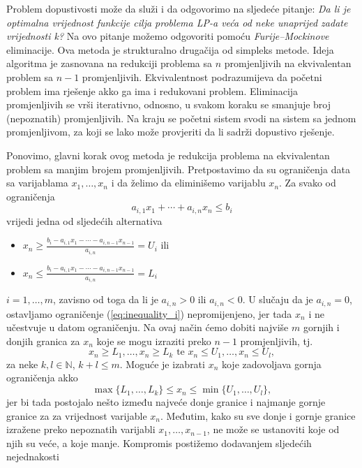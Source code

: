 \documentclass[a4paper, utf8, 11pt, colorlinks]{book}
\theoremstyle{definition}
\begin{document}
Problem dopustivosti može da služi i da odgovorimo na sljedeće pitanje: 
\emph{Da li je optimalna vrijednost funkcije cilja problema LP-a veća od neke unaprijed zadate  vrijednosti k?}
 Na ovo pitanje možemo odgovoriti pomoću  \emph{Furije–Mockinove} eliminacije. Ova metoda je strukturalno drugačija  od simpleks metode. Ideja algoritma je zasnovana na redukciji problema sa $n$ promjenljivih na ekvivalentan problem sa $n-1$ promjenljivih. Ekvivalentnost podrazumijeva da početni problem ima rješenje akko  ga ima i redukovani problem. Eliminacija promjenljivih se vrši iterativno, odnosno, u svakom koraku se smanjuje broj (nepoznatih)  promjenljivih. Na kraju se početni sistem svodi na sistem sa jednom promjenljivom, za koji se lako može provjeriti da li sadrži dopustivo rješenje.
 
 Ponovimo, glavni korak ovog metoda je redukcija problema na ekvivalentan problem sa manjim brojem promjenljivih. Pretpostavimo da su ograničenja data sa varijablama $x_1,\ldots, x_n$ i da želimo da eliminišemo varijablu $x_n$. Za svako od ograničenja
 \begin{equation}\label{eq:inequality_i}
      a_{i,1} x_1 + \cdots + a_{i,n} x_n \leq b_i
 \end{equation}
 vrijedi jedna od sljedećih alternativa 
 \begin{itemize}
 	 \item  $x_n \geq \frac{b_i - a_{i,1}x_1- \cdots - a_{i, n-1} x_{n-1} }{a_{i,n}}=U_i$ ili 
 	 \item   $x_n \leq \frac{b_i - a_{i,1}x_1- \cdots - a_{i, n-1} x_{n-1} }{a_{i,n}}=L_i$
 \end{itemize}
 $i=1,\ldots, m$, zavisno od toga da li je $a_{i,n} >0$ ili $a_{i,n} <0$. U slučaju da je $a_{i,n} = 0$,  ostavljamo  ograničenje (\ref{eq:inequality_i}) nepromijenjeno, jer tada $x_n$ i ne učestvuje u datom ograničenju. Na ovaj način ćemo dobiti najviše $m$ gornjih i donjih granica za $x_n$ koje se mogu izraziti preko $n-1$ promjenljivih, tj. 
 $$  x_n \geq L_1, \ldots, x_n\geq L_k \mbox{ te }  x_n \leq U_1, \ldots, x_n \leq U_l,$$
  za neke $k,l \in \mathbb{N}$, $k+l \leq m$.
 Moguće je izabrati $x_n$ koje zadovoljava gornja ograničenja akko 
 \begin{equation}\label{eq:min_max_xi}
     \max\{L_1,\ldots, L_k \} \leq x_n \leq \min \{ U_1, \ldots, U_l \},
   \end{equation}
 jer bi tada postojalo nešto između najveće donje granice i najmanje gornje granice za za vrijednost varijable $x_n$. Međutim, kako su sve donje i gornje granice izražene preko nepoznatih varijabli $x_1, \ldots, x_{n-1}$, ne može se ustanoviti koje od njih su veće, a koje manje. Kompromis postižemo dodavanjem  sljedećih nejednakosti 
\end{document}
